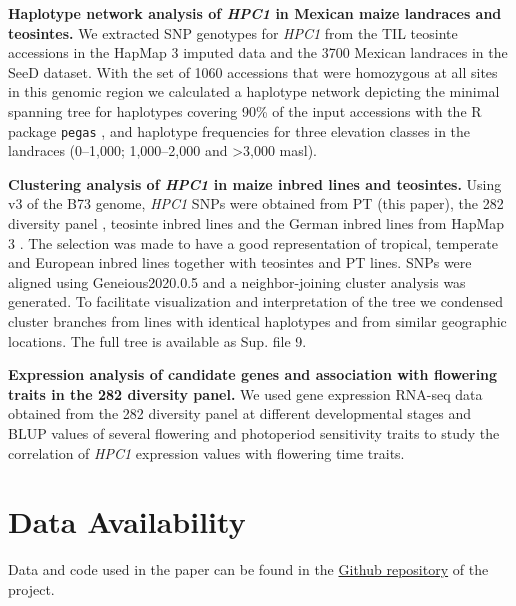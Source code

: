 \documentclass[9pt,twocolumn,twoside,lineno]{biorxiv}
\def\code#1{\texttt{#1}}
\begin{document}
\textbf{Haplotype network analysis of \textit{HPC1} in Mexican maize landraces and teosintes.}
We extracted SNP genotypes for \textit{HPC1} from the TIL teosinte accessions in the HapMap 3 imputed data \cite{Bukowski2017-ng} and the 3700 Mexican landraces in the SeeD dataset. 
With the set of 1060 accessions that were homozygous at all sites in this genomic region we calculated a haplotype network depicting the minimal spanning tree for haplotypes covering 90\% of the input accessions with the R package \code{pegas} \cite{paradis2010}, and haplotype frequencies for three elevation classes in the landraces (0--1,000; 1,000--2,000 and >3,000 masl).

\textbf{Clustering analysis of \textit{HPC1} in maize inbred lines and teosintes.}
Using v3 of the B73 genome, \textit{HPC1} SNPs were obtained from PT (this paper), the 282 diversity panel \cite{Flint-Garcia2005-hb}, teosinte inbred lines and the German inbred lines from HapMap 3 \cite{Bukowski2017-ng}. 
The selection was made to have a good representation of tropical, temperate and European inbred lines together with teosintes and PT lines.
SNPs were aligned using Geneious2020.0.5 and a neighbor-joining cluster analysis was generated. 
To facilitate visualization and interpretation of the tree we condensed cluster branches from lines with identical haplotypes and from similar geographic locations. 
The full tree is available as Sup. file 9. 

\textbf{Expression analysis of candidate genes and association with flowering traits in the 282 diversity panel.}
We used gene expression RNA-seq data obtained from the 282 diversity panel at different developmental stages \cite{Kremling2018-gn} and BLUP values of several flowering and photoperiod sensitivity traits \cite{Hung2012-ms} to study the correlation of \textit{HPC1} expression values with flowering time traits.  

\section{Data Availability}
Data and code used in the paper can be found in the \href{https://github.com/sawers-rellan-labs/High-PC1-paper}{Github repository} of the project. 
\end{document}
